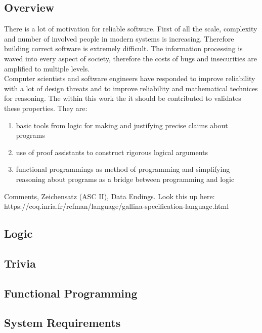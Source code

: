 \subsection{Overview}
There is a lot of motivation for reliable software. 
First of all the scale, complexity and number of involved people in modern systems is increasing.
Therefore building correct software is extremely difficult.
The information processing is waved into every aspect of society, 
therefore the costs of bugs and insecurities are amplified to multiple levels.\\
Computer scientists and software engineers have responded to improve reliability with a lot of design threats and to improve reliability and mathematical technices for reasoning.
The within this work the it should be contributed to validates these properties. They are:
\begin{enumerate}
\item basic tools from logic for making and justifying precise claims about programs
\item use of proof assistants to construct rigorous logical arguments
\item functional programmings as method of programming and simplifying reasoning about programs as a bridge between programming and logic
\end{enumerate}


Comments, Zeichensatz (ASC II), Data Endings.
Look this up here:\\
https://coq.inria.fr/refman/language/gallina-specification-language.html




\subsection{Logic}



\subsection{Trivia}



\subsection{Functional Programming}


\subsection{System Requirements}



